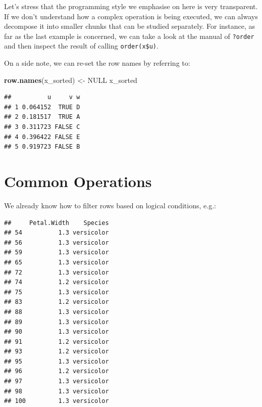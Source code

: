 \documentclass[10pt,b5paper,krantz1]{krantz}
\newenvironment{Shaded}{\begin{snugshade}}{\end{snugshade}}
\newcommand{\FloatTok}[1]{\textcolor[rgb]{0.06,0.06,0.06}{#1}}
\newcommand{\KeywordTok}[1]{\textcolor[rgb]{0.27,0.27,0.27}{\textbf{#1}}}
\newcommand{\NormalTok}[1]{#1}
\newcommand{\OperatorTok}[1]{\textcolor[rgb]{0.43,0.43,0.43}{\textbf{#1}}}
\newcommand{\OtherTok}[1]{\textcolor[rgb]{0.37,0.37,0.37}{#1}}
\newcommand{\StringTok}[1]{\textcolor[rgb]{0.5,0.5,0.5}{#1}}
\begin{document}
Let's stress that the programming style we emphasise on here is very
transparent. If we don't understand how a complex operation is being executed,
we can always decompose it into smaller chunks that can be studied separately.
For instance, as far as the last example is concerned, we can
take a look at the manual of \texttt{?order} and then inspect the result
of calling \texttt{order(x\$u)}.

On a side note, we can re-set the row names by referring to:

\begin{Shaded}
\begin{Highlighting}[]
\KeywordTok{row.names}\NormalTok{(x_sorted) <-}\StringTok{ }\OtherTok{NULL}
\NormalTok{x_sorted}
\end{Highlighting}
\end{Shaded}

\begin{verbatim}
##          u     v w
## 1 0.064152  TRUE D
## 2 0.181517  TRUE A
## 3 0.311723 FALSE C
## 4 0.396422 FALSE E
## 5 0.919723 FALSE B
\end{verbatim}

\hypertarget{common-operations-2}{%
\section{Common Operations}\label{common-operations-2}}

We already know how to filter rows based on logical conditions, e.g.:

\begin{Shaded}
\end{Shaded}

\begin{verbatim}
##     Petal.Width    Species
## 54          1.3 versicolor
## 56          1.3 versicolor
## 59          1.3 versicolor
## 65          1.3 versicolor
## 72          1.3 versicolor
## 74          1.2 versicolor
## 75          1.3 versicolor
## 83          1.2 versicolor
## 88          1.3 versicolor
## 89          1.3 versicolor
## 90          1.3 versicolor
## 91          1.2 versicolor
## 93          1.2 versicolor
## 95          1.3 versicolor
## 96          1.2 versicolor
## 97          1.3 versicolor
## 98          1.3 versicolor
## 100         1.3 versicolor
\end{verbatim}
\end{document}
